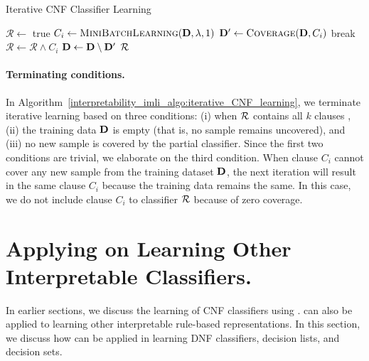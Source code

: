 \begin{algorithm}
	\caption{Iterative CNF Classifier Learning}
	\label{interpretability_imli_algo:iterative_CNF_learning}
	\begin{algorithmic}[1]
		\State $ \mathcal{R} \leftarrow $ true 
		\State $ C_i \leftarrow \textsc{MiniBatchLearning}( \mathbf{D},\lambda, 1) $ 
		\label{interpretability_imli_algo:iterative_CNF_learning_incremental_learning}
		\State $ \mathbf{D}' \leftarrow \textsc{Coverage}(\mathbf{D}, C_i) $
		\label{interpretability_imli_algo:iterative_CNF_learning_coverage}
		 
		\State break
		\EndIf
		\State $ \mathcal{R} \leftarrow \mathcal{R}  \wedge C_i $
		\State $ \mathbf{D}  \leftarrow \mathbf{D}  \setminus \mathbf{D}' $ 
		\EndFor
		\State \Return $ {\mathcal{R}} $
		\EndProcedure
	\end{algorithmic}
\end{algorithm}

\paragraph{Terminating conditions.} In Algorithm~\ref{interpretability_imli_algo:iterative_CNF_learning}, we terminate iterative learning based on three conditions: (i) when $ {\mathcal{R}} $ contains all $ k $ clauses , (ii) the training data $ \mathbf{D} $ is empty (that is, no sample remains uncovered), and (iii) no new sample is covered by the partial classifier. Since the first two conditions are trivial, we elaborate on the third condition. When clause $ C_i $ cannot cover any new sample from the training dataset $ \mathbf{D} $, the next iteration will result in the same clause $ C_i $ because the training data remains the same. In this case, we do not include clause $ C_i $ to classifier $ {\mathcal{R}} $ because of zero coverage. 




\section{Applying {\imli} on Learning Other Interpretable Classifiers.}
\label{interpretability_imli_sec:application}
In earlier sections, we discuss the learning of CNF classifiers using  {\imli}. {\imli} can also be applied to learning other interpretable rule-based representations. In this section, we discuss how {\imli} can be applied in learning DNF classifiers, decision lists, and decision sets.

